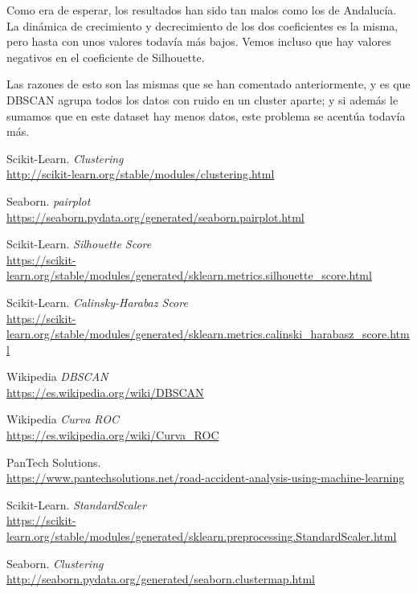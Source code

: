 \documentclass[11pt,a4paper]{article}
\begin{document}
Como era de esperar, los resultados han sido tan malos como los de Andalucía. La dinámica de crecimiento y decrecimiento de los dos
coeficientes es la misma, pero hasta con unos valores todavía más bajos. Vemos incluso que hay valores negativos en el coeficiente
de Silhouette.

Las razones de esto son las mismas que se han comentado anteriormente, y es que DBSCAN agrupa todos los datos con ruido en un cluster
aparte; y si además le sumamos que en este dataset hay menos datos, este problema se acentúa todavía más.



\newpage

\begin{thebibliography}{}
    
    Scikit-Learn. \textit{Clustering}
    \\\url{http://scikit-learn.org/stable/modules/clustering.html}

    Seaborn. \textit{pairplot}
    \\\url{https://seaborn.pydata.org/generated/seaborn.pairplot.html}
    
    Scikit-Learn. \textit{Silhouette Score}
    \\\url{https://scikit-learn.org/stable/modules/generated/sklearn.metrics.silhouette_score.html}

    Scikit-Learn. \textit{Calinsky-Harabaz Score}
    \\\url{https://scikit-learn.org/stable/modules/generated/sklearn.metrics.calinski_harabasz_score.html}

    Wikipedia \textit{DBSCAN}
    \\\url{https://es.wikipedia.org/wiki/DBSCAN}

    Wikipedia \textit{Curva ROC}
    \\\url{https://es.wikipedia.org/wiki/Curva_ROC}
    
    PanTech Solutions.
    \\\url{https://www.pantechsolutions.net/road-accident-analysis-using-machine-learning}
    
    Scikit-Learn. \textit{StandardScaler}
    \\\url{https://scikit-learn.org/stable/modules/generated/sklearn.preprocessing.StandardScaler.html}

    Seaborn. \textit{Clustering}
    \\\url{http://seaborn.pydata.org/generated/seaborn.clustermap.html}
    
    \end{thebibliography}
\end{document}

